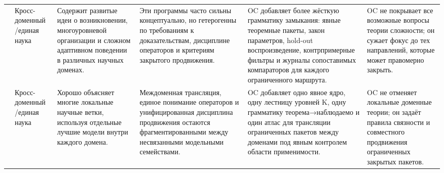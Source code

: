\begin{longtable}{@{}L{0.17\textwidth}L{0.09\textwidth}L{0.17\textwidth}L{0.17\textwidth}L{0.20\textwidth}L{0.14\textwidth}@{}}
 & Кросс-доменный /\allowbreak единая наука & Содержит развитые идеи о возникновении, многоуровневой организации и сложном адаптивном поведении в различных научных доменах. & Эти программы часто сильны концептуально, но гетерогенны по требованиям к доказательствам, дисциплине операторов и критериям закрытого продвижения. & OC добавляет более жёсткую грамматику замыкания: явные теоремные пакеты, закон параметров, hold-out воспроизведение, контрпримерные фильтры и журналы сопоставимых компараторов для каждого ограниченного маршрута. & OC не покрывает все возможные вопросы теории сложности; он сужает фокус до тех направлений, которые может правомерно закрыть. \\
 & Кросс-доменный /\allowbreak единая наука & Хорошо объясняет многие локальные научные ветки, используя отдельные лучшие модели внутри каждого домена. & Междоменная трансляция, единое понимание операторов и унифицированная дисциплина продвижения остаются фрагментированными между несвязанными модельными семействами. & OC добавляет одно явное ядро, одну лестницу уровней K, одну грамматику теорема→наблюдаемо и один атлас для трансляции ограниченных пакетов между доменами под явным контролем области применимости. & OC не отменяет локальные доменные теории; он задаёт правила связности и совместного продвижения ограниченных закрытых пакетов. \\
\bottomrule
\end{longtable}

